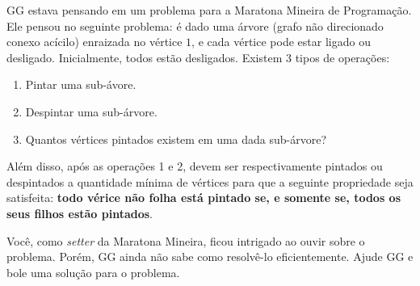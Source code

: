 %

GG estava pensando em um problema para a Maratona Mineira de Programação. Ele pensou no seguinte problema: é dado uma árvore (grafo não direcionado conexo acícilo) enraizada no vértice $1$, e cada vértice pode estar ligado ou desligado. Inicialmente, todos estão desligados. Existem 3 tipos de operações:

\begin{enumerate}
	\item Pintar uma sub-ávore.
	\item Despintar uma sub-árvore.
	\item Quantos vértices pintados existem em uma dada sub-árvore?
\end{enumerate}

Além disso, após as operações 1 e 2, devem ser respectivamente pintados ou despintados a quantidade mínima de vértices para que a seguinte propriedade seja satisfeita: \textbf{todo vérice não folha está pintado se, e somente se, todos os seus filhos estão pintados}.

Você, como \textit{setter} da Maratona Mineira, ficou intrigado ao ouvir sobre o problema. Porém, GG ainda não sabe como resolvê-lo eficientemente. Ajude GG e bole uma solução para o problema.

%
%


%
%



\sampleio
